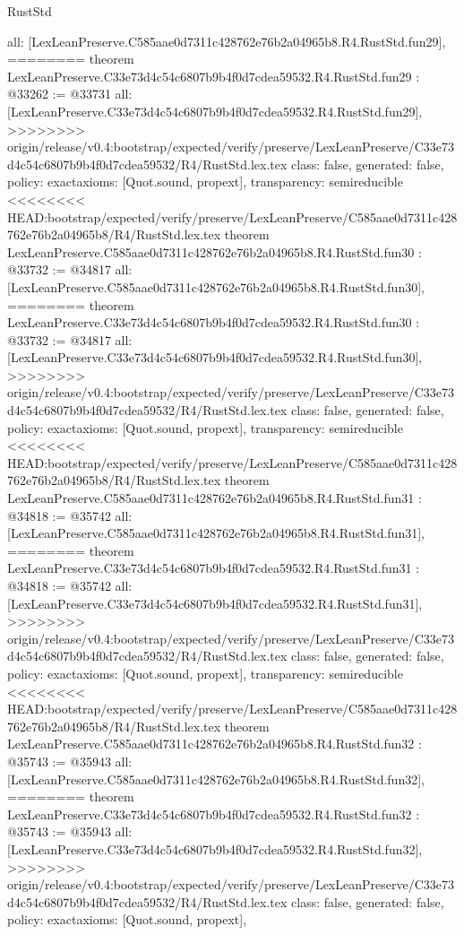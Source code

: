 \begin{lexlean}{RustStd}
\begin{coremodule}
{\begin{coremodule}
{{{{{{{{{{{{{{{{{{{{{{{{{{{{{{{{  all: [LexLeanPreserve.C585aae0d7311c428762e76b2a04965b8.R4.RustStd.fun29],
========
theorem LexLeanPreserve.C33e73d4c54c6807b9b4f0d7cdea59532.R4.RustStd.fun29 : @33262 := @33731 {
  all: [LexLeanPreserve.C33e73d4c54c6807b9b4f0d7cdea59532.R4.RustStd.fun29],
>>>>>>>> origin/release/v0.4:bootstrap/expected/verify/preserve/LexLeanPreserve/C33e73d4c54c6807b9b4f0d7cdea59532/R4/RustStd.lex.tex
  class: false,
  generated: false,
  policy: exact{axioms: [Quot.sound, propext]},
  transparency: semireducible
}
<<<<<<<< HEAD:bootstrap/expected/verify/preserve/LexLeanPreserve/C585aae0d7311c428762e76b2a04965b8/R4/RustStd.lex.tex
theorem LexLeanPreserve.C585aae0d7311c428762e76b2a04965b8.R4.RustStd.fun30 : @33732 := @34817 {
  all: [LexLeanPreserve.C585aae0d7311c428762e76b2a04965b8.R4.RustStd.fun30],
========
theorem LexLeanPreserve.C33e73d4c54c6807b9b4f0d7cdea59532.R4.RustStd.fun30 : @33732 := @34817 {
  all: [LexLeanPreserve.C33e73d4c54c6807b9b4f0d7cdea59532.R4.RustStd.fun30],
>>>>>>>> origin/release/v0.4:bootstrap/expected/verify/preserve/LexLeanPreserve/C33e73d4c54c6807b9b4f0d7cdea59532/R4/RustStd.lex.tex
  class: false,
  generated: false,
  policy: exact{axioms: [Quot.sound, propext]},
  transparency: semireducible
}
<<<<<<<< HEAD:bootstrap/expected/verify/preserve/LexLeanPreserve/C585aae0d7311c428762e76b2a04965b8/R4/RustStd.lex.tex
theorem LexLeanPreserve.C585aae0d7311c428762e76b2a04965b8.R4.RustStd.fun31 : @34818 := @35742 {
  all: [LexLeanPreserve.C585aae0d7311c428762e76b2a04965b8.R4.RustStd.fun31],
========
theorem LexLeanPreserve.C33e73d4c54c6807b9b4f0d7cdea59532.R4.RustStd.fun31 : @34818 := @35742 {
  all: [LexLeanPreserve.C33e73d4c54c6807b9b4f0d7cdea59532.R4.RustStd.fun31],
>>>>>>>> origin/release/v0.4:bootstrap/expected/verify/preserve/LexLeanPreserve/C33e73d4c54c6807b9b4f0d7cdea59532/R4/RustStd.lex.tex
  class: false,
  generated: false,
  policy: exact{axioms: [Quot.sound, propext]},
  transparency: semireducible
}
<<<<<<<< HEAD:bootstrap/expected/verify/preserve/LexLeanPreserve/C585aae0d7311c428762e76b2a04965b8/R4/RustStd.lex.tex
theorem LexLeanPreserve.C585aae0d7311c428762e76b2a04965b8.R4.RustStd.fun32 : @35743 := @35943 {
  all: [LexLeanPreserve.C585aae0d7311c428762e76b2a04965b8.R4.RustStd.fun32],
========
theorem LexLeanPreserve.C33e73d4c54c6807b9b4f0d7cdea59532.R4.RustStd.fun32 : @35743 := @35943 {
  all: [LexLeanPreserve.C33e73d4c54c6807b9b4f0d7cdea59532.R4.RustStd.fun32],
>>>>>>>> origin/release/v0.4:bootstrap/expected/verify/preserve/LexLeanPreserve/C33e73d4c54c6807b9b4f0d7cdea59532/R4/RustStd.lex.tex
  class: false,
  generated: false,
  policy: exact{axioms: [Quot.sound, propext]},
}}}}}}}}}}}}}}}}}}}}}}}}}}}}}}}}}}}}
\end{coremodule}}
\end{coremodule}
\end{lexlean}
